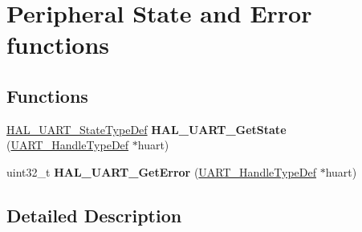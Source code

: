 \hypertarget{group___u_a_r_t___exported___functions___group4}{}\section{Peripheral State and Error functions}
\label{group___u_a_r_t___exported___functions___group4}
\subsection*{Functions}
\begin{DoxyCompactItemize}
\item 
\mbox{\label{group___u_a_r_t___exported___functions___group4_ga8fcec96f9d249f41ecf0c7598ab421e5}} 
\mbox{\hyperlink{group___u_a_r_t___exported___types_ga94c58ae1f4dbcf6032224edfc93a6e19}{H\+A\+L\+\_\+\+U\+A\+R\+T\+\_\+\+State\+Type\+Def}} {\bfseries H\+A\+L\+\_\+\+U\+A\+R\+T\+\_\+\+Get\+State} (\mbox{\hyperlink{group___u_a_r_t___exported___types_ga7adf4f3e4c3ecde572be5925c915a967}{U\+A\+R\+T\+\_\+\+Handle\+Type\+Def}} $\ast$huart)
\item 
\mbox{\label{group___u_a_r_t___exported___functions___group4_ga6c5f93a76a0bd01ad2d1351adddfa63f}} 
uint32\+\_\+t {\bfseries H\+A\+L\+\_\+\+U\+A\+R\+T\+\_\+\+Get\+Error} (\mbox{\hyperlink{group___u_a_r_t___exported___types_ga7adf4f3e4c3ecde572be5925c915a967}{U\+A\+R\+T\+\_\+\+Handle\+Type\+Def}} $\ast$huart)
\end{DoxyCompactItemize}


\subsection{Detailed Description}
